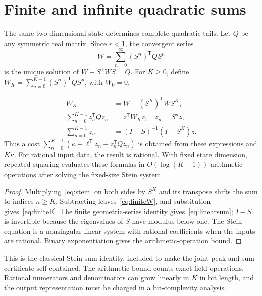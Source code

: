 \documentclass[11pt,a4paper]{article}
\begin{document}
\section{Finite and infinite quadratic sums}
The same two-dimensional state determines complete quadratic tails.
Let $Q$ be any symmetric real matrix. Since $r<1$, the convergent series
\begin{equation}\label{eq:stein}
 W=\sum_{n=0}^{\infty}(S^n)^\mathsf TQS^n
\end{equation}
is the unique solution of $W-S^\mathsf TWS=Q$.
For $K\ge0$, define $W_K=\sum_{n=0}^{K-1}(S^n)^\mathsf TQS^n$,
with $W_0=0$.

\begin{proposition}\label{prop:energy}
\begin{align}
 W_K&=W-(S^K)^\mathsf TWS^K,\label{eq:finiteW}\\
 \sum_{n=0}^{K-1}z_n^\mathsf TQz_n&=z^\mathsf TW_Kz,
 \quad z_n=S^nz,\label{eq:finiteE}\\
 \sum_{n=0}^{K-1}z_n&=(I-S)^{-1}(I-S^K)z.\label{eq:linearsum}
\end{align}
Thus a cost $\sum_{n=0}^{K-1}(\kappa+\ell^\mathsf Tz_n+z_n^\mathsf TQz_n)$
is obtained from these expressions and $K\kappa$.
For rational input data, the result is rational. With fixed state dimension,
repeated squaring evaluates these formulas in $O(\log(K+1))$ arithmetic
operations after solving the fixed-size Stein system.
\end{proposition}
\begin{proof}
Multiplying~\eqref{eq:stein} on both sides by $S^K$ and its transpose
shifts the sum to indices $n\ge K$. Subtracting leaves~\eqref{eq:finiteW},
and substitution gives~\eqref{eq:finiteE}. The finite geometric-series
identity gives~\eqref{eq:linearsum}; $I-S$ is invertible because the
eigenvalues of $S$ have modulus below one. The Stein equation is a
nonsingular linear system with rational coefficients when the inputs
are rational. Binary exponentiation gives the arithmetic-operation bound.
\end{proof}

This is the classical Stein-sum identity, included to make the joint
peak-and-sum certificate self-contained. The arithmetic bound counts exact
field operations. Rational numerators and denominators can grow linearly
in $K$ in bit length, and the output representation must be charged in a
bit-complexity analysis.
\end{document}
